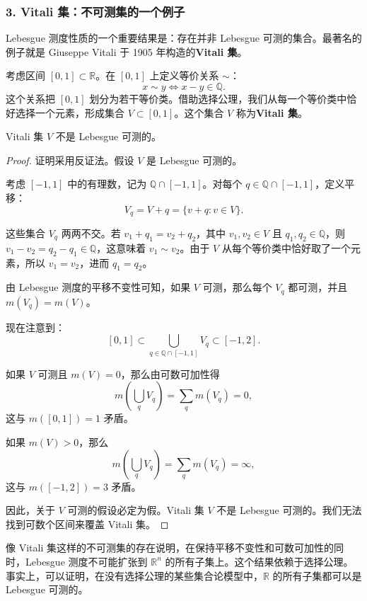 \subsubsection*{3. Vitali 集：不可测集的一个例子}

Lebesgue 测度性质的一个重要结果是：存在并非 Lebesgue 可测的集合。最著名的例子就是 Giuseppe Vitali 于 1905 年构造的\textbf{Vitali 集}。

\begin{definition}
考虑区间 $[0,1]\subset\mathbb{R}$。在 $[0,1]$ 上定义等价关系 $\sim$：
\[
x\sim y\iff x-y\in\mathbb{Q}.
\]
这个关系把 $[0,1]$ 划分为若干等价类。借助选择公理，我们从每一个等价类中恰好选择一个元素，形成集合 $V\subset[0,1]$。这个集合 $V$ 称为\textbf{Vitali 集}。
\end{definition}

\begin{theorem}
Vitali 集 $V$ 不是 Lebesgue 可测的。
\end{theorem}

\begin{proof}
证明采用反证法。假设 $V$ 是 Lebesgue 可测的。

考虑 $[-1,1]$ 中的有理数，记为 $\mathbb{Q}\cap[-1,1]$。对每个 $q\in\mathbb{Q}\cap[-1,1]$，定义平移：
\[
V_q=V+q=\{v+q:v\in V\}.
\]

这些集合 $V_q$ 两两不交。若 $v_1+q_1=v_2+q_2$，其中 $v_1,v_2\in V$ 且 $q_1,q_2\in\mathbb{Q}$，则 $v_1-v_2=q_2-q_1\in\mathbb{Q}$，这意味着 $v_1\sim v_2$。由于 $V$ 从每个等价类中恰好取了一个元素，所以 $v_1=v_2$，进而 $q_1=q_2$。

由 Lebesgue 测度的平移不变性可知，如果 $V$ 可测，那么每个 $V_q$ 都可测，并且 $m(V_q)=m(V)$。

现在注意到：
\[
[0,1]\subset\bigcup_{q\in\mathbb{Q}\cap[-1,1]}V_q\subset[-1,2].
\]

如果 $V$ 可测且 $m(V)=0$，那么由可数可加性得
\[
m\left(\bigcup_q V_q\right)=\sum_q m(V_q)=0,
\]
这与 $m([0,1])=1$ 矛盾。

如果 $m(V)>0$，那么
\[
m\left(\bigcup_q V_q\right)=\sum_q m(V_q)=\infty,
\]
这与 $m([-1,2])=3$ 矛盾。

因此，关于 $V$ 可测的假设必定为假。Vitali 集 $V$ 不是 Lebesgue 可测的。我们无法找到可数个区间来覆盖 Vitali 集。
\end{proof}

\begin{remark}
像 Vitali 集这样的不可测集的存在说明，在保持平移不变性和可数可加性的同时，Lebesgue 测度不可能扩张到 $\mathbb{R}^n$ 的所有子集上。这个结果依赖于选择公理。事实上，可以证明，在没有选择公理的某些集合论模型中，$\mathbb{R}$ 的所有子集都可以是 Lebesgue 可测的。
\end{remark}

